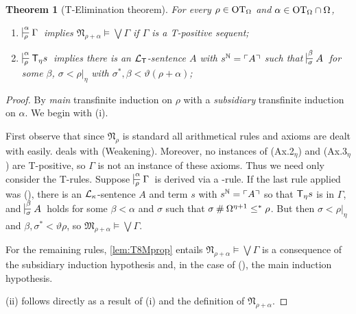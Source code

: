 \documentclass[UKenglish,cleveref,DIV=12]{scrartcl}
\newtheorem{theorem}{Theorem}
\theoremstyle{definition}
\theoremstyle{definition}
\begin{document}
\begin{theorem}[T-Elimination theorem]\label{lem:T8model}\label{lem:T8TElim}
For every $\rho\in\mathrm{OT}_\Omega$ and $\alpha\in\mathrm{OT}_\Omega\cap\Omega$,
\begin{enumerate}
 \item $\prov\alpha\rho\Gamma$ implies $\mathfrak N_{\rho+\alpha}\models\bigvee\Gamma$  if $\Gamma$ is a T-positive sequent;
 \item $\prov\alpha\rho{\T_\eta s}$ implies there is an $\mathcal{L}_{\mathsf{T}}$-sentence $A$ with $s^\mathbb N=\ulcorner{A}\urcorner$ such that $\prov\beta\sigma A$ for some $\beta$, $\sigma<\rho|_\eta$ with $\sigma^*,\beta<\vartheta(\rho+\alpha)$;
\end{enumerate}
\end{theorem}
\begin{proof} By \emph{main} transfinite induction on $\rho$ with a \emph{subsidiary} transfinite induction on $\alpha$. We begin with (i).

First observe that since $\mathfrak N_\rho$ is standard all
arithmetical rules and axioms are dealt with easily.  deals
with (Weakening). Moreover, no instances of (Ax.2$_\eta$) and
(Ax.3$_\eta$) are T-positive, so $\Gamma$ is not an instance of these axioms. Thus
we need only consider the T-rules. Suppose $\prov\alpha\rho\Gamma$
is derived via a \textT\eta-rule. If the last rule applied was
(\Nec\eta), there is an $\mathcal{L}_\kappa$-sentence $A$ and term $s$ with
$s^\mathbb N=\ulcorner{A}\urcorner$ so that $\mathsf{T}_\eta s$ is in $\Gamma$, and $\prov\beta\sigma A$
holds for some $\beta<\alpha$ and $\sigma$ such that
$\sigma\mathbin{\#}\Omega^{\eta+1}\le^*\rho$. But then $\sigma<\rho|_\eta$ and $\beta,\sigma^*<\vartheta\rho$, so $\mathfrak{M}_{\rho+\alpha}\models\bigvee\Gamma$.

For the remaining rules, \cref{lem:T8Mprop} entails $\mathfrak N_{\rho+\alpha}\models\bigvee\Gamma$ is a consequence of the subsidiary induction hypothesis and, in the case of (\Del\eta), the main induction hypothesis.

(ii) follows directly as a result of (i) and the definition of $\mathfrak N_{\rho+\alpha}$.

\end{proof}
\end{document}
